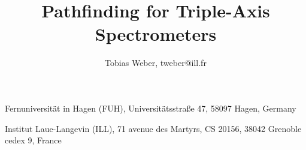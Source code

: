 \documentclass[english, 11pt, a4paper]{book}
\newcommand{\ill}{\par{Institut Laue-Langevin (ILL), 71 avenue des Martyrs, CS 20156, 38042 Grenoble cedex 9, France\par}}
\newcommand{\fuh}{\par{Fernuniversit\"at in Hagen (FUH), Universit\"atsstraße 47, 58097 Hagen, Germany\par}}
\begin{document}
\title{Pathfinding for Triple-Axis Spectrometers}
\author{Tobias Weber, tweber@ill.fr}
\maketitle

\vspace*{\fill}
\fuh
\ill

\tableofcontents




















\appendix




%



\listoffigures{}
\listoftables{}
\cleardoublepage
{}

\end{document}
